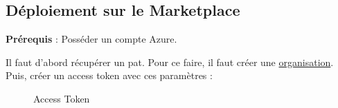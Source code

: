 \documentclass[
    iict, %
    il, %
]{heig-tb}
\begin{document}
\subsection{Déploiement sur le Marketplace}




\textbf{Prérequis} : Posséder un compte Azure.

Il faut d'abord récupérer un \Gls{pat}. Pour ce faire, il faut créer une \href{https://docs.microsoft.com/en-us/azure/devops/organizations/accounts/create-organization?view=azure-devops}{organisation}.
Puis, créer un access token avec ces paramètres :
\begin{figure}[!h]
    \begin{center}
    \end{center}
    \caption[Access Token]{\label{access-token}Access Token}
\end{figure}
\end{document}

